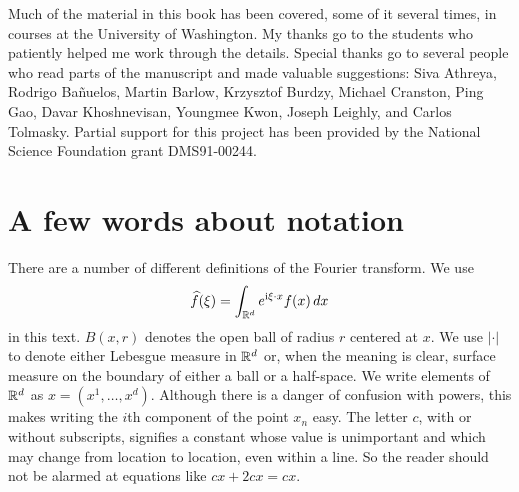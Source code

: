 Much of the material in this book has been covered, some of it several times, in courses at the University of Washington. My thanks go to the students who patiently helped me work through the details. Special thanks go to several people who read parts of the manuscript and made valuable suggestions: Siva Athreya, Rodrigo Ba\~nuelos, Martin Barlow, Krzysztof Burdzy, Michael Cranston, Ping Gao, Davar Khoshnevisan, Youngmee Kwon, Joseph Leighly, and Carlos Tolmasky. Partial support for this project has been provided by the National Science Foundation grant DMS91-00244.

\newpage

\section*{A few words about notation}

There are a number of different definitions of the Fourier transform. We use
\[
    \widehat{f}(\xi) = \int_{\mathbb{R}^d} e^{\mathrm{i}\xi\cdot x}f(x)\,dx
\]
in this text. $B(x,r)$ denotes the open ball of radius $r$ centered at $x$. We use $|\cdot|$ to denote either Lebesgue measure in $\mathbb{R}^d$ or, when the meaning is clear, surface measure on the boundary of either a ball or a half-space. We write elements of $\mathbb{R}^d$ as $x = (x^1,\ldots,x^d)$. Although there is a danger of confusion with powers, this makes writing the $i$th component of the point $x_n$ easy. The letter $c$, with or without subscripts, signifies a constant whose value is unimportant and which may change from location to location, even within a line. So the reader should not be alarmed at equations like $cx + 2cx = cx$.